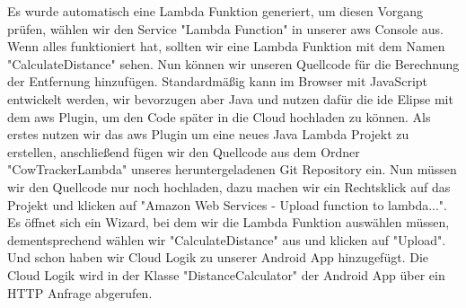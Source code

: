 Es wurde automatisch eine Lambda Funktion generiert, um diesen Vorgang prüfen, wählen wir den Service "Lambda Function" in unserer \gls{aws} Console aus. Wenn alles funktioniert hat, sollten wir eine Lambda Funktion mit dem Namen "CalculateDistance" sehen. Nun können wir unseren Quellcode für die Berechnung der Entfernung hinzufügen. Standardmäßig kann im Browser mit JavaScript entwickelt werden, wir bevorzugen aber Java und nutzen dafür die \gls{ide} Elipse mit dem \gls{aws} Plugin, um den Code später in die Cloud hochladen zu können. Als erstes nutzen wir das \gls{aws} Plugin um eine neues Java Lambda Projekt zu erstellen, anschließend fügen wir den Quellcode aus dem Ordner "CowTrackerLambda" unseres heruntergeladenen Git Repository ein. Nun müssen wir den Quellcode nur noch hochladen, dazu machen wir ein Rechtsklick auf das Projekt und klicken auf "Amazon Web Services - Upload function to lambda...". Es öffnet sich ein Wizard, bei dem wir die Lambda Funktion auswählen müssen, dementsprechend wählen wir "CalculateDistance" aus und klicken auf "Upload". Und schon haben wir Cloud Logik zu unserer Android App hinzugefügt. Die Cloud Logik wird in der Klasse "DistanceCalculator" der Android App über ein HTTP Anfrage abgerufen. 

